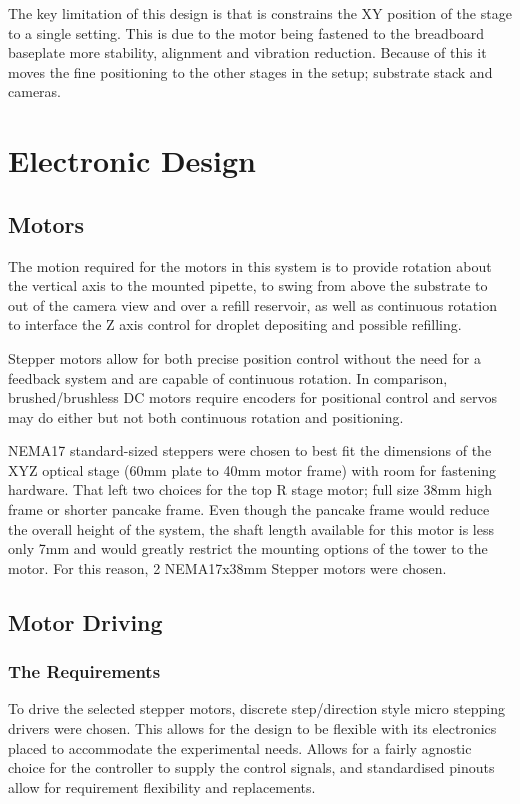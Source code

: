The key limitation of this design is that is constrains the XY position of the stage to a single setting. This is due to the motor being fastened to the breadboard baseplate more stability, alignment and vibration reduction. Because of this it moves the fine positioning to the other stages in the setup; substrate stack and cameras. 

\section{Electronic Design}

\subsection{Motors}
The motion required for the motors in this system is to provide rotation about the vertical axis to the mounted pipette, to swing from above the substrate to out of the camera view and over a refill reservoir, as well as continuous rotation to interface the Z axis control for droplet depositing and possible refilling.

Stepper motors allow for both precise position control without the need for a feedback system and are capable of continuous rotation. In comparison, brushed/brushless DC motors require encoders for positional control and servos may do either but not both continuous rotation and positioning.

NEMA17 standard-sized steppers were chosen to best fit the dimensions of the XYZ optical stage (60mm plate to 40mm motor frame) with room for fastening hardware. That left two choices for the top R stage motor; full size 38mm high frame or shorter pancake frame. Even though the pancake frame would reduce the overall height of the system, the shaft length available for this motor is less only 7mm and would greatly restrict the mounting options of the tower to the motor. For this reason, 2 NEMA17x38mm Stepper motors were chosen.

\subsection{Motor Driving}

\subsubsection*{The Requirements}
To drive the selected stepper motors, discrete step/direction style micro stepping drivers were chosen. This allows for the design to be flexible with its electronics placed to accommodate the experimental needs. Allows for a fairly agnostic choice for the controller to supply the control signals, and standardised pinouts allow for requirement flexibility and replacements.

